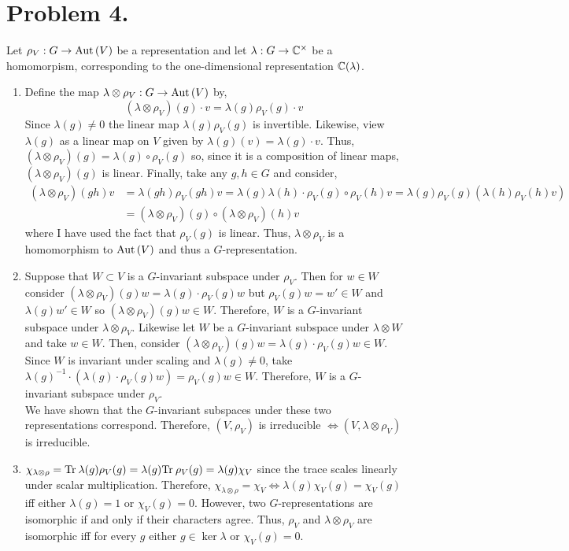\documentclass[12pt]{extarticle}
\begin{document}
\section*{Problem 4.}
Let $\rho_V : G \to \mathrm{Aut}\left( V \right)$ be a representation and let $\lambda : G \to \mathbb{C}^\times$ be a homomorpism, corresponding to the one-dimensional representation $\mathbb{C}(\lambda)$. 
\begin{enumerate}
\item Define the map $\lambda \otimes \rho_V : G \to \mathrm{Aut}\left( V \right)$ by,
\[ (\lambda \otimes \rho_V)(g) \cdot v = \lambda(g) \rho_V(g) \cdot v \]
Since $\lambda (g) \neq 0$ the linear map $\lambda(g) \rho_V(g)$ is invertible. Likewise, view $\lambda(g)$ as a linear map on $V$ given by $\lambda(g)(v) = \lambda(g) \cdot v$. Thus, $(\lambda \otimes \rho_V)(g) = \lambda(g) \circ \rho_V(g)$ so, since it is a composition of linear maps, $(\lambda \otimes \rho_V)(g)$ is linear. Finally, take any $g, h \in G$ and consider,
\begin{align*}
(\lambda \otimes \rho_V)(gh) v & = \lambda(gh) \rho_V(gh) v = \lambda(g) \lambda(h) \cdot \rho_V(g) \circ \rho_V(h) v = \lambda(g) \rho_V(g) ( \lambda(h) \rho_V(h) v)
\\
& = (\lambda \otimes \rho_V)(g) \circ (\lambda \otimes \rho_V)(h) v
\end{align*} 
where I have used the fact that $\rho_V(g)$ is linear. Thus, $\lambda \otimes \rho_V$ is a homomorphism to $\mathrm{Aut}\left( V \right)$ and thus a $G$-representation.

\item Suppose that $W \subset V$ is a $G$-invariant subspace under $\rho_V$. Then for $w \in W$ consider $(\lambda \otimes \rho_V)(g) w = \lambda(g) \cdot \rho_V(g) w$ but $\rho_V(g) w = w' \in W$ and $\lambda(g) w' \in W$ so $(\lambda \otimes \rho_V)(g) w \in W$. Therefore, $W$ is a $G$-invariant subspace under $\lambda \otimes \rho_V$. Likewise let $W$ be a $G$-invariant subspace under $\lambda \otimes W$ and take $w \in W$. Then, consider $(\lambda \otimes \rho_V)(g) w = \lambda(g) \cdot \rho_V(g) w \in W$. Since $W$ is invariant under scaling and $\lambda(g) \neq 0$, take $\lambda(g)^{-1} \cdot (\lambda(g) \cdot \rho_V(g) w) = \rho_V(g) w \in W$. Therefore, $W$ is a $G$-invariant subspace under $\rho_V$. \bigskip\\
We have shown that the $G$-invariant subspaces under these two representations correspond. Therefore, $(V, \rho_V)$ is irreducible $\iff (V, \lambda \otimes \rho_V)$ is irreducible.

\item 
$\chi_{\lambda \otimes \rho} = \mathrm{Tr} \: \lambda(g) \rho_V(g) = \lambda(g) \mathrm{Tr} \: \rho_V(g) = \lambda(g) \chi_V$ since the trace scales linearly under scalar multiplication. Therefore, $\chi_{\lambda \otimes \rho} = \chi_{V} \iff \lambda(g) \chi_V(g) = \chi_V(g)$ iff either $\lambda(g) = 1$ or $\chi_V(g) = 0$. However, two $G$-representations are isomorphic if and only if their characters agree. Thus, $\rho_V$ and $\lambda \otimes \rho_V$ are isomorphic iff for every $g$ either $g \in \ker{\lambda}$ or $\chi_V(g) = 0$. 


\end{enumerate}
\end{document}
